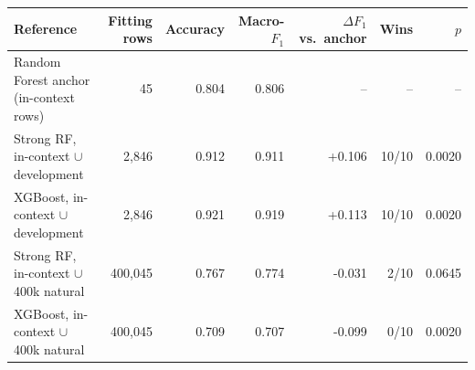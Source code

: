\begin{tabular}{@{}lrrrrrr@{}}
\toprule
Reference & Fitting rows & Accuracy & Macro-$F_1$ & $\Delta F_1$ vs.\ anchor & Wins & $p$ \\
\midrule
Random Forest anchor (in-context rows) & 45 & 0.804 & 0.806 & -- & -- & -- \\
Strong RF, in-context $\cup$ development & 2,846 & 0.912 & 0.911 & +0.106 & 10/10 & 0.0020 \\
XGBoost, in-context $\cup$ development & 2,846 & 0.921 & 0.919 & +0.113 & 10/10 & 0.0020 \\
Strong RF, in-context $\cup$ 400k natural & 400,045 & 0.767 & 0.774 & -0.031 & 2/10 & 0.0645 \\
XGBoost, in-context $\cup$ 400k natural & 400,045 & 0.709 & 0.707 & -0.099 & 0/10 & 0.0020 \\
\bottomrule
\end{tabular}
